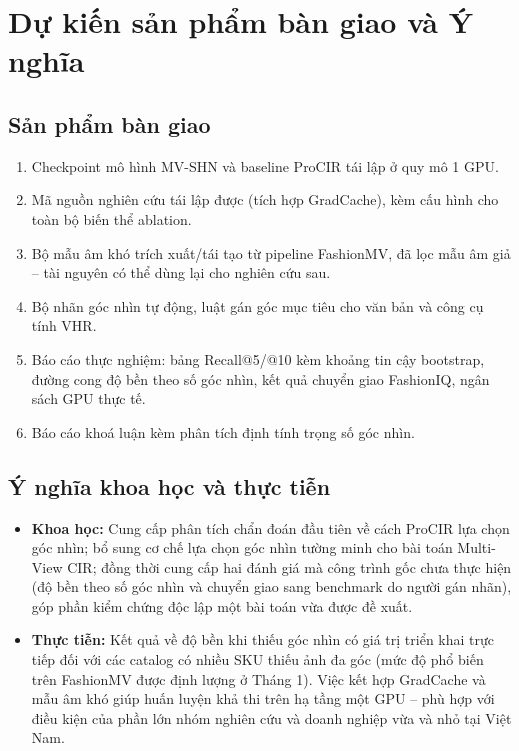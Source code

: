 \documentclass[a4paper]{article}
\begin{document}
\section{Dự kiến sản phẩm bàn giao và Ý nghĩa}

\subsection{Sản phẩm bàn giao}
\begin{enumerate}
\item Checkpoint mô hình MV-SHN và baseline ProCIR tái lập ở quy mô 1 GPU.
\item Mã nguồn nghiên cứu tái lập được (tích hợp GradCache), kèm cấu hình cho toàn bộ biến thể ablation.
\item Bộ mẫu âm khó trích xuất/tái tạo từ pipeline FashionMV, đã lọc mẫu âm giả -- tài nguyên có thể dùng lại cho nghiên cứu sau.
\item Bộ nhãn góc nhìn tự động, luật gán góc mục tiêu cho văn bản và công cụ tính VHR.
\item Báo cáo thực nghiệm: bảng Recall@5/@10 kèm khoảng tin cậy bootstrap, đường cong độ bền theo số góc nhìn, kết quả chuyển giao FashionIQ, ngân sách GPU thực tế.
\item Báo cáo khoá luận kèm phân tích định tính trọng số góc nhìn.
\end{enumerate}

\subsection{Ý nghĩa khoa học và thực tiễn}
\begin{itemize}
\item \textbf{Khoa học:} Cung cấp phân tích chẩn đoán đầu tiên về cách ProCIR lựa chọn góc nhìn; bổ sung cơ chế lựa chọn góc nhìn tường minh cho bài toán Multi-View CIR; đồng thời cung cấp hai đánh giá mà công trình gốc chưa thực hiện (độ bền theo số góc nhìn và chuyển giao sang benchmark do người gán nhãn), góp phần kiểm chứng độc lập một bài toán vừa được đề xuất.
\item \textbf{Thực tiễn:} Kết quả về độ bền khi thiếu góc nhìn có giá trị triển khai trực tiếp đối với các catalog có nhiều SKU thiếu ảnh đa góc (mức độ phổ biến trên FashionMV được định lượng ở Tháng 1). Việc kết hợp GradCache và mẫu âm khó giúp huấn luyện khả thi trên hạ tầng một GPU -- phù hợp với điều kiện của phần lớn nhóm nghiên cứu và doanh nghiệp vừa và nhỏ tại Việt Nam.
\end{itemize}
\end{document}
